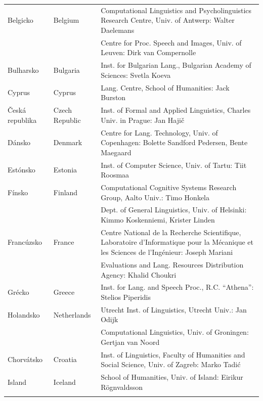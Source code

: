 \small
\begin{longtable}{@{}llp{113mm}@{}}
  Belgicko & \textcolor{grey1}{Belgium} & Computational Linguistics and Psycholinguistics Research Centre, Univ. of Antwerp: Walter Daelemans\\ \addlinespace & & Centre for Proc. Speech and Images, Univ. of Leuven: Dirk van Compernolle \\ \addlinespace
  Bulharsko & \textcolor{grey1}{Bulgaria} & Inst. for Bulgarian Lang., Bulgarian Academy of Sciences: Svetla Koeva \\ \addlinespace
  Cyprus & \textcolor{grey1}{Cyprus} & Lang. Centre, School of Humanities: Jack Burston \\ \addlinespace
  Česká republika & \textcolor{grey1}{Czech Republic} & Inst. of Formal and Applied Linguistics, Charles Univ. in Prague: Jan Hajič \\ \addlinespace
  Dánsko &  \textcolor{grey1}{Denmark} & Centre for Lang. Technology, Univ. of Copenhagen: Bolette Sandford Pedersen, Bente Maegaard\\ \addlinespace
  Estónsko & \textcolor{grey1}{Estonia} & Inst. of Computer Science, Univ. of Tartu: Tiit Roosmaa\\ \addlinespace
  Fínsko & \textcolor{grey1}{Finland} & Computational Cognitive Systems Research Group, Aalto Univ.: Timo Honkela\\ \addlinespace  & & Dept. of General Linguistics, Univ. of Helsinki: Kimmo Koskenniemi, Krister Linden \\ \addlinespace
  Francúzsko & \textcolor{grey1}{France} & Centre National de la Recherche Scientifique, Laboratoire d'Informatique pour la Mécanique et les Sciences de l'Ingénieur: Joseph Mariani \\ \addlinespace  & & Evaluations and Lang. Resources Distribution Agency: Khalid Choukri\\ \addlinespace 
  Grécko & \textcolor{grey1}{Greece} & Inst. for Lang. and Speech Proc., R.C. “Athena”: Stelios Piperidis\\ \addlinespace
  Holandsko & \textcolor{grey1}{Netherlands} & Utrecht Inst. of Linguistics, Utrecht Univ.: Jan Odijk\\ \addlinespace   & & Computational Linguistics, Univ. of Groningen: Gertjan van Noord\\ \addlinespace
  Chorvátsko & \textcolor{grey1}{Croatia} & Inst. of Linguistics, Faculty of Humanities and Social Science, Univ. of Zagreb: Marko Tadić \\ \addlinespace
  Island & \textcolor{grey1}{Iceland} & School of Humanities, Univ. of Island: Eirikur Rögnvaldsson\\ \addlinespace

\end{longtable}
